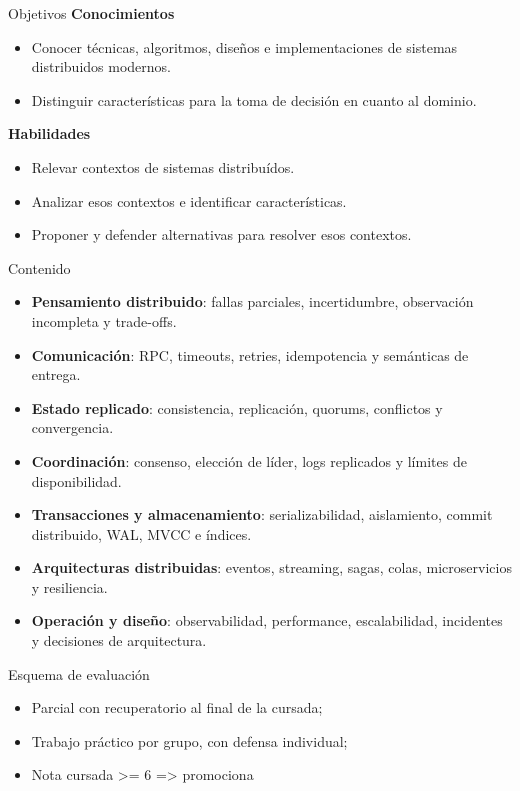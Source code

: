 \documentclass[institutional,screen,none]{ua-engineering-v6-beamer}
\begin{document}
\begin{frame}{Objetivos}
    \textbf{Conocimientos}
    \begin{itemize}
        \item Conocer técnicas, algoritmos, diseños e implementaciones de sistemas distribuidos modernos.
        \item Distinguir características para la toma de decisión en cuanto al dominio.
    \end{itemize}
    \textbf{Habilidades}
    \begin{itemize}
        \item Relevar contextos de sistemas distribuídos.
        \item Analizar esos contextos e identificar características.
        \item Proponer y defender alternativas para resolver esos contextos.
    \end{itemize}
\end{frame}

\begin{frame}{Contenido}
    \begin{itemize}
        \item \textbf{Pensamiento distribuido}: fallas parciales, incertidumbre, observación incompleta y trade-offs.
        \item \textbf{Comunicación}: RPC, timeouts, retries, idempotencia y semánticas de entrega.
        \item \textbf{Estado replicado}: consistencia, replicación, quorums, conflictos y convergencia.
        \item \textbf{Coordinación}: consenso, elección de líder, logs replicados y límites de disponibilidad.
        \item \textbf{Transacciones y almacenamiento}: serializabilidad, aislamiento, commit distribuido, WAL, MVCC e índices.
        \item \textbf{Arquitecturas distribuidas}: eventos, streaming, sagas, colas, microservicios y resiliencia.
        \item \textbf{Operación y diseño}: observabilidad, performance, escalabilidad, incidentes y decisiones de arquitectura.
    \end{itemize}
\end{frame}

\begin{frame}{Esquema de evaluación}
    \begin{itemize}
        \item Parcial con recuperatorio al final de la cursada;
        \item Trabajo práctico por grupo, con defensa individual;
        \item Nota cursada >= 6 => promociona 
    \end{itemize}
\end{frame}
\end{document}
